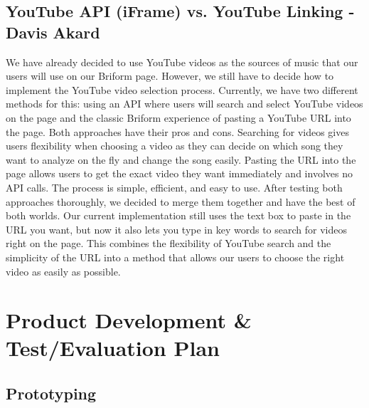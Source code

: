 \documentclass[12pt, letterpaper]{article}
\begin{document}
\subsection*{YouTube API (iFrame) vs. YouTube Linking - Davis Akard}
We have already decided to use YouTube videos as the sources of music that our users will use on our Briform page. However, we still have to decide how to implement the YouTube video selection process. Currently, we have two different methods for this: using an API where users will search and select YouTube videos on the page and the classic Briform experience of pasting a YouTube URL into the page. Both approaches have their pros and cons. Searching for videos gives users flexibility when choosing a video as they can decide on which song they want to analyze on the fly and change the song easily. Pasting the URL into the page allows users to get the exact video they want immediately and involves no API calls. The process is simple, efficient, and easy to use. After testing both approaches thoroughly, we decided to merge them together and have the best of both worlds. Our current implementation still uses the text box to paste in the URL you want, but now it also lets you type in key words to search for videos right on the page. This combines the flexibility of YouTube search and the simplicity of the URL into a method that allows our users to choose the right video as easily as possible.

\section*{Product Development \& Test/Evaluation Plan}

\subsection*{Prototyping}
\end{document}
